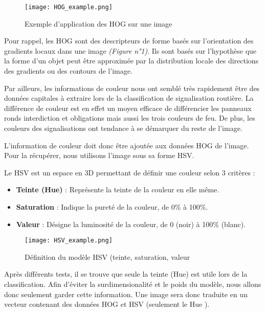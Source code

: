 \documentclass[a4paper,11pt]{article}
\begin{document}
\begin{figure}[H]
    \centering
    \texttt{[image: HOG\_example.png]}
    \caption{Exemple d'application des HOG sur une image}
    \label{fig:enter-label}
\end{figure}

\noindent Pour rappel, les HOG sont des descripteurs de forme basés sur l'orientation des gradients locaux dans une image \textit{(Figure n°1)}. Ils sont basés sur l'hypothèse que la forme d'un objet peut être approximée par la distribution locale des directions des gradients ou des contours de l'image.

\vspace{2mm}

\noindent Par ailleurs, les informations de couleur nous ont semblé très rapidement être des données capitales à extraire lors de la classification de signalisation routière. La différence de couleur est en effet un moyen efficace de différencier les panneaux ronds interdiction et obligations mais aussi les trois couleurs de feu. De plus, les couleurs des signalisations ont tendance à se démarquer du reste de l'image.

L'information de couleur doit donc être ajoutée aux données HOG de l'image. Pour la récupérer, nous utilisons l'image sous sa forme HSV.

\noindent Le HSV est un espace en 3D permettant de définir une couleur selon 3 critères : 

\begin{itemize}[noitemsep]
    \item \textbf{Teinte (Hue)} : Représente la teinte de la couleur en elle même.
    \item \textbf{Saturation} : Indique la pureté de la couleur, de 0\% à 100\%.
    \item \textbf{Valeur} : Désigne la luminosité de la couleur, de 0 (noir) à 100\% (blanc).
\end{itemize}

\begin{figure}[H]
    \centering
    \texttt{[image: HSV\_example.png]}
    \caption{Définition du modèle HSV (teinte, saturation, valeur}
    \label{fig:enter-label}
\end{figure}

\noindent Après différents tests, il se trouve que seule la teinte (Hue) est utile lors de la classification. Afin d'éviter la surdimensionalité et le poids du modèle, nous allons donc seulement garder cette information. Une image sera donc traduite en un vecteur contenant des données HOG et HSV (seulement le Hue ).
\end{document}
